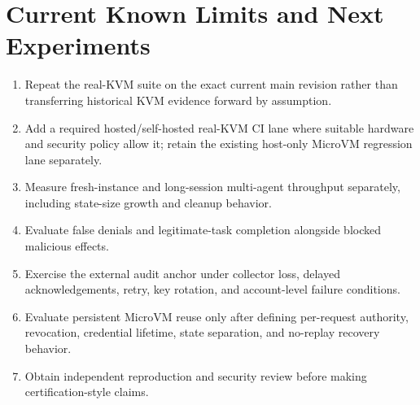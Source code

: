 \documentclass[journal]{IEEEtran}
\begin{document}
\section{Current Known Limits and Next Experiments}
\begin{enumerate}
\item Repeat the real-KVM suite on the exact current main revision rather than transferring historical KVM evidence forward by assumption.
\item Add a required hosted/self-hosted real-KVM CI lane where suitable hardware and security policy allow it; retain the existing host-only MicroVM regression lane separately.
\item Measure fresh-instance and long-session multi-agent throughput separately, including state-size growth and cleanup behavior.
\item Evaluate false denials and legitimate-task completion alongside blocked malicious effects.
\item Exercise the external audit anchor under collector loss, delayed acknowledgements, retry, key rotation, and account-level failure conditions.
\item Evaluate persistent MicroVM reuse only after defining per-request authority, revocation, credential lifetime, state separation, and no-replay recovery behavior.
\item Obtain independent reproduction and security review before making certification-style claims.
\end{enumerate}
\end{document}
